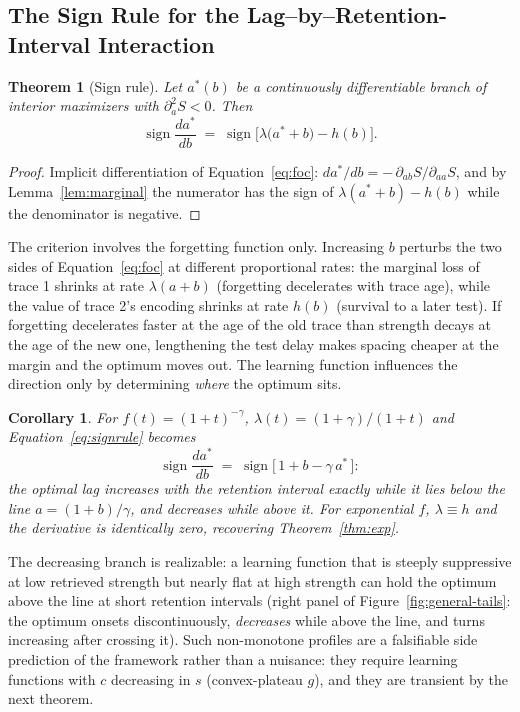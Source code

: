 \documentclass[man, 12pt, floatsintext]{apa6}
\newtheorem{theorem}{Theorem}
\newtheorem{corollary}{Corollary}
\theoremstyle{definition}
\theoremstyle{remark}
\begin{document}
\subsection{The Sign Rule for the Lag--by--Retention-Interval Interaction}

\begin{theorem}[Sign rule]\label{thm:sign}
Let $a^*(b)$ be a continuously differentiable branch of interior maximizers with $\partial^2_a S < 0$. Then
\begin{equation}\label{eq:signrule}
  \operatorname{sign} \frac{da^*}{db} \;=\; \operatorname{sign}\Big[ \lambda\big(a^* + b\big) - h(b) \Big].
\end{equation}
\end{theorem}

\begin{proof}
Implicit differentiation of Equation~\ref{eq:foc}: $da^*/db = -\,\partial_{ab}S / \partial_{aa}S$, and by Lemma~\ref{lem:marginal} the numerator has the sign of $\lambda(a^*+b) - h(b)$ while the denominator is negative.
\end{proof}

The criterion involves the forgetting function only. Increasing $b$ perturbs the two sides of Equation~\ref{eq:foc} at different proportional rates: the marginal loss of trace 1 shrinks at rate $\lambda(a+b)$ (forgetting decelerates with trace age), while the value of trace 2's encoding shrinks at rate $h(b)$ (survival to a later test). If forgetting decelerates faster at the age of the old trace than strength decays at the age of the new one, lengthening the test delay makes spacing cheaper at the margin and the optimum moves out. The learning function influences the direction only by determining \emph{where} the optimum sits.

\begin{corollary}\label{cor:signpower}
For $f(t)=(1+t)^{-\gamma}$, $\lambda(t) = (1+\gamma)/(1+t)$ and Equation~\ref{eq:signrule} becomes
\begin{equation}
  \operatorname{sign} \frac{da^*}{db} \;=\; \operatorname{sign}\big[\, 1 + b - \gamma\, a^* \,\big]:
\end{equation}
the optimal lag increases with the retention interval exactly while it lies below the line $a = (1+b)/\gamma$, and decreases while above it. For exponential $f$, $\lambda \equiv h$ and the derivative is identically zero, recovering Theorem~\ref{thm:exp}.
\end{corollary}

The decreasing branch is realizable: a learning function that is steeply suppressive at low retrieved strength but nearly flat at high strength can hold the optimum above the line at short retention intervals (right panel of Figure~\ref{fig:general-tails}: the optimum onsets discontinuously, \emph{decreases} while above the line, and turns increasing after crossing it). Such non-monotone profiles are a falsifiable side prediction of the framework rather than a nuisance: they require learning functions with $c$ decreasing in $s$ (convex-plateau $g$), and they are transient by the next theorem.
\end{document}
